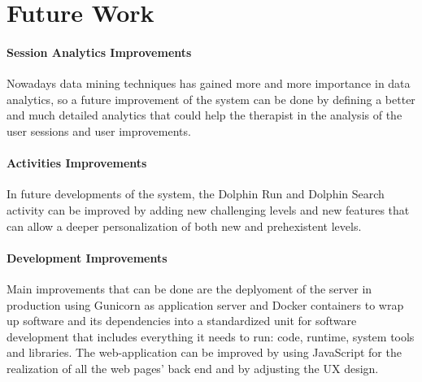 	\chapter{Future Work}
	
	\subsubsection{\textbf{\Large Session Analytics Improvements}}
	Nowadays data mining techniques has gained more and more importance in data analytics, so a future improvement of the system can be done by defining a better and much detailed analytics that could help the therapist in the analysis of the user sessions and user improvements.
	
	\subsubsection{\textbf{\Large Activities Improvements}}
	In future developments of the system, the Dolphin Run and Dolphin Search activity can be improved by adding new challenging levels and new features that can allow a deeper personalization of both new and prehexistent levels.
	
	\subsubsection{\textbf{\Large Development Improvements}}
	Main improvements that can be done are the deplyoment of the server in production using Gunicorn as application server and Docker containers to wrap up software and its dependencies into a standardized unit for software development that includes everything it needs to run: code, runtime, system tools and libraries. \newline
	The web-application can be improved by using JavaScript for the realization of all the web pages' back end and by adjusting the UX design.
	


	
	
	